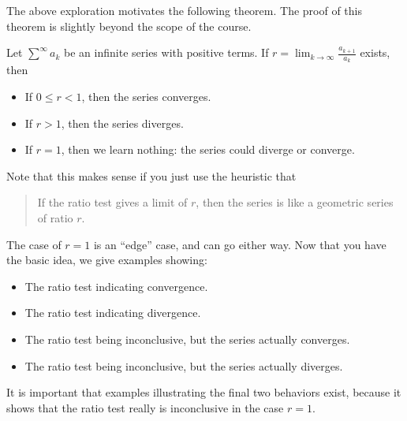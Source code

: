 \documentclass{ximera}
\begin{document}
The above exploration motivates the following theorem.  The proof of
this theorem is slightly beyond the scope of the course.

\begin{theorem}
  Let $\sum^\infty a_k$ be an infinite series with positive terms.  If $r =
  \lim_{k \to \infty} \frac{a_{k+1}}{a_k}$ exists, then
  \begin{itemize}
  \item If $0 \leq r < 1$, then the series converges.
  \item If $r>1$, then the series diverges.
  \item If $r = 1$, then we learn nothing:  the series could diverge or converge.
  \end{itemize}
\end{theorem}

Note that this makes sense if you just use the heuristic that
\begin{quote}
  If the ratio test gives a limit of $r$, then the series is like a
  geometric series of ratio $r$.
\end{quote}
The case of $r=1$ is an ``edge'' case, and can go either way.  Now
that you have the basic idea, we give examples showing:
\begin{itemize}
\item The ratio test indicating convergence.
\item The ratio test indicating divergence.
\item The ratio test being inconclusive, but the series actually converges.
\item The ratio test being inconclusive, but the series actually diverges.
\end{itemize}
It is important that examples illustrating the final two behaviors
exist, because it shows that the ratio test really is inconclusive in
the case $r=1$.
\end{document}
